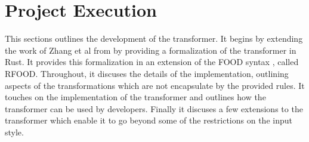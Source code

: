 \documentclass[ oneside,%
                    author={James Elgar},
                    degree={MEng},
                     title={Bidirectional transformer between functional and \\ object-oriented programming in Rust},
                  subtitle={}]{dissertation}
\newcommand{\weixin}{Zhang et al }
\begin{document}


\chapter{Project Execution}
\label{chap:execution}


This sections outlines the development of the transformer. It begins by extending the work of \weixin from \cite{food} by providing a formalization of the transformer in Rust. It provides this formalization in an extension of the FOOD syntax \cite{food}, called RFOOD. Throughout, it discuses the details of the implementation, outlining aspects of the transformations which are not encapsulate by the provided rules. It touches on the implementation of the transformer and outlines how the transformer can be used by developers. Finally it discuses a few extensions to the transformer which enable it to go beyond some of the restrictions on the input style.



\end{document}
